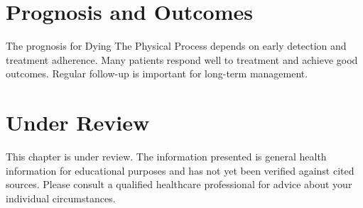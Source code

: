 \section*{Prognosis and Outcomes}
The prognosis for Dying The Physical Process depends on early detection and treatment adherence. Many patients respond well to treatment and achieve good outcomes. Regular follow-up is important for long-term management.
\section*{Under Review}
This chapter is under review. The information presented is general health information for educational purposes and has not yet been verified against cited sources. Please consult a qualified healthcare professional for advice about your individual circumstances.


\clearpage
